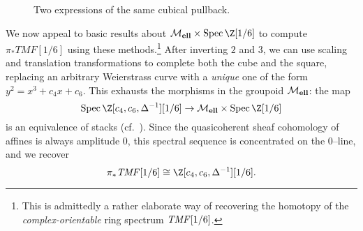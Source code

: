 \begin{figure}
    \begin{center}
     \hspace{1em}
    \end{center}
    \caption{Two expressions of the same cubical pullback.}\label{HypercubesFigure}
\end{figure}

\begin{example}
We now appeal to basic results about $\moduli{ell} \times \Spec \Z[1/6]$ to compute $\pi_* TMF[1/6]$ using these methods.\footnote{This is admittedly a rather elaborate way of recovering the homotopy of the \emph{complex-orientable} ring spectrum $\mathit{TMF}[1/6]$.}  After inverting $2$ and $3$, we can use scaling and translation transformations to complete both the cube and the square, replacing an arbitrary Weierstrass curve with a \emph{unique} one of the form $y^2 = x^3 + c_4 x + c_6$.  This exhausts the morphisms in the groupoid $\mathcal{M}_{\mathbf{ell}}$: the map \[\Spec \Z[c_4, c_6, \Delta^{-1}][1/6] \to \moduli{ell} \times \Spec \Z[1/6]\] is an equivalence of stacks (cf.\ ).  Since the quasicoherent sheaf cohomology of affines is always amplitude $0$, this spectral sequence is concentrated on the $0$--line, and we recover \[\pi_* \TMF[1/6] \cong \Z[c_4, c_6, \Delta^{-1}][1/6].\]
\end{example}




















